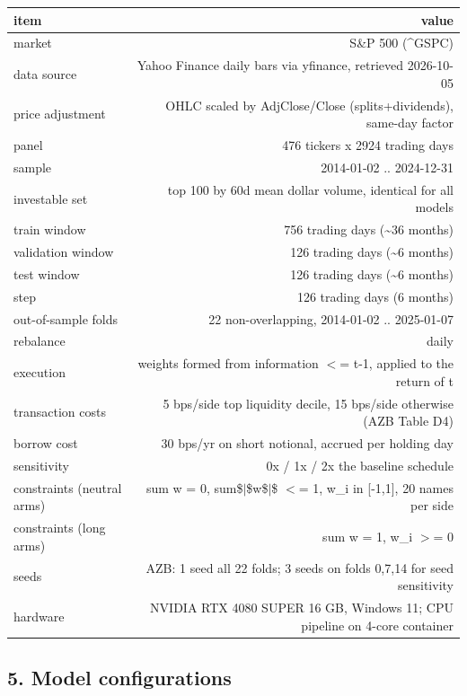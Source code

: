 \begin{center}\footnotesize\begin{longtable}{lr}
\toprule
item & value \\
\midrule
market & S\&P 500 (\textasciicircum{}GSPC) \\
data source & Yahoo Finance daily bars via yfinance, retrieved 2026-10-05 \\
price adjustment & OHLC scaled by AdjClose/Close (splits+dividends), same-day factor \\
panel & 476 tickers x 2924 trading days \\
sample & 2014-01-02 .. 2024-12-31 \\
investable set & top 100 by 60d mean dollar volume, identical for all models \\
train window & 756 trading days (\textasciitilde{}36 months) \\
validation window & 126 trading days (\textasciitilde{}6 months) \\
test window & 126 trading days (\textasciitilde{}6 months) \\
step & 126 trading days (6 months) \\
out-of-sample folds & 22 non-overlapping, 2014-01-02 .. 2025-01-07 \\
rebalance & daily \\
execution & weights formed from information $<$= t-1, applied to the return of t \\
transaction costs & 5 bps/side top liquidity decile, 15 bps/side otherwise (AZB Table D4) \\
borrow cost & 30 bps/yr on short notional, accrued per holding day \\
sensitivity & 0x / 1x / 2x the baseline schedule \\
constraints (neutral arms) & sum w = 0, sum\$$|$\$w\$$|$\$ $<$= 1, w\_i in [-1,1], 20 names per side \\
constraints (long arms) & sum w = 1, w\_i $>$= 0 \\
seeds & AZB: 1 seed all 22 folds; 3 seeds on folds {0,7,14} for seed sensitivity \\
hardware & NVIDIA RTX 4080 SUPER 16 GB, Windows 11; CPU pipeline on 4-core container \\
\bottomrule
\end{longtable}\end{center}

\subsection*{5. Model configurations}

